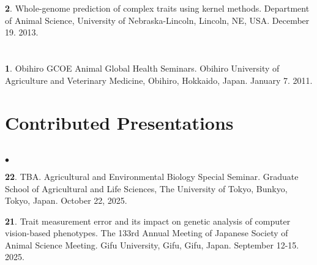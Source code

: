 \documentclass[margin,line,10pt]{res}
\newenvironment{list1}{
  \begin{list}{\ding{113}}{%
      \setlength{\itemsep}{0in}
      \setlength{\parsep}{0in} \setlength{\parskip}{0in}
      \setlength{\topsep}{0in} \setlength{\partopsep}{0in} 
      \setlength{\leftmargin}{0.17in}}}{\end{list}}
\newenvironment{list2}{
  \begin{list}{$\bullet$}{%
      \setlength{\itemsep}{0in}
      \setlength{\parsep}{0in} \setlength{\parskip}{0in}
      \setlength{\topsep}{0in} \setlength{\partopsep}{0in} 
      \setlength{\leftmargin}{0.2in}}}{\end{list}}
\begin{document}
\begin{resume}
\section{}
\begin{list1}
\item [{\bf 2}.] Whole-genome prediction of complex traits using kernel methods. Department of Animal Science, University of Nebraska-Lincoln, Lincoln, NE, USA. December 19. 2013.
\end{list1}

\section{}
\begin{list1}
\item [{\bf 1}.] Obihiro GCOE Animal Global Health Seminars.  Obihiro University of Agriculture and  Veterinary Medicine, Obihiro, Hokkaido, Japan. January 7. 2011.
\end{list1}  



\vspace{0.5cm}
\section{\sc Contributed Presentations}
\vspace{1.0cm}

\section{}
\begin{list2}

  \item [{\bf 22}.] TBA. Agricultural and Environmental Biology Special Seminar. Graduate School of Agricultural and Life Sciences, The University of Tokyo, Bunkyo, Tokyo, Japan. October 22, 2025. 

  \vspace{0.5cm}

  \item [{\bf 21}.] Trait measurement error and its impact on genetic analysis of computer vision-based phenotypes. The 133rd Annual Meeting of Japanese Society of Animal Science Meeting. Gifu University, Gifu, Gifu, Japan. September 12-15. 2025. 


\end{list2}
\end{resume}
\end{document}
